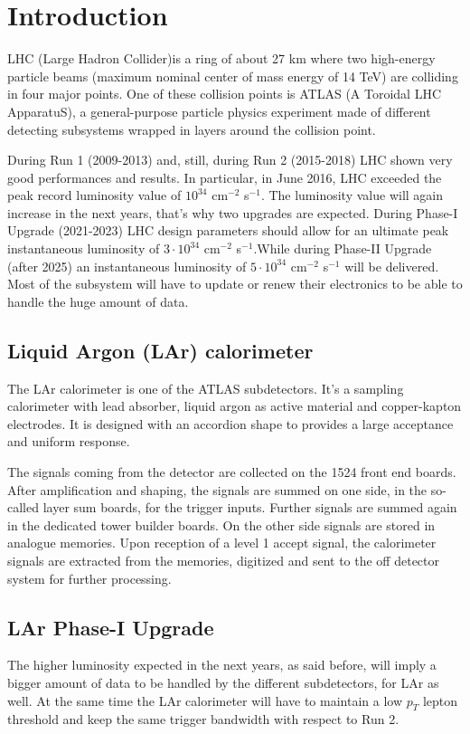\documentclass{llncs}
\begin{document}
\section{Introduction}
LHC (Large Hadron Collider)is a ring of about 27 km where two high-energy particle beams (maximum nominal center of mass energy of 14 TeV) are colliding in four major points. One of these collision points is ATLAS (A Toroidal LHC ApparatuS), a general-purpose particle physics experiment made of different detecting subsystems wrapped in layers around the collision point.

During Run 1 (2009-2013) and, still, during Run 2 (2015-2018) LHC shown very good performances and results. In particular, in June 2016, LHC exceeded the peak record luminosity value of $10^{34}$ cm$^{-2}$ s$^{-1}$. The luminosity value will again increase in the next years, that's why two upgrades are expected. During Phase-I Upgrade (2021-2023) LHC design parameters should allow for an ultimate peak instantaneous luminosity of $3 \cdot 10^{34}$ cm$^{-2}$ s$^{-1}$.While during Phase-II Upgrade (after 2025) an instantaneous luminosity of $5 \cdot 10^{34}$ cm$^{-2}$ s$^{-1}$ will be delivered. Most of the subsystem will have to update or renew their electronics to be able to handle the huge amount of data.

\subsection{Liquid Argon (LAr) calorimeter}
The LAr calorimeter is one of the ATLAS subdetectors. It's a sampling calorimeter with lead absorber, liquid argon as active material and copper-kapton electrodes. It is designed with an accordion shape to provides a large acceptance and uniform response.

The signals coming from the detector are collected on the 1524 front end boards. After amplification and shaping, the signals are summed on one side, in the so-called layer sum boards, for the trigger inputs. Further signals are summed again in the dedicated tower builder boards. On the other side signals are stored in analogue memories. Upon reception of a level 1 accept signal, the calorimeter signals are extracted from the memories, digitized and sent to the off detector system for further processing.
\cite{Wilken:1269029} \cite{Aleksa:1602230}

\subsection{LAr Phase-I Upgrade}
The higher luminosity expected in the next years, as said before, will imply a bigger amount of data to be handled by the different subdetectors, for LAr as well. At the same time the LAr calorimeter will have to maintain a low $p_{T}$ lepton threshold and keep the same trigger bandwidth with respect to Run 2.
\end{document}
